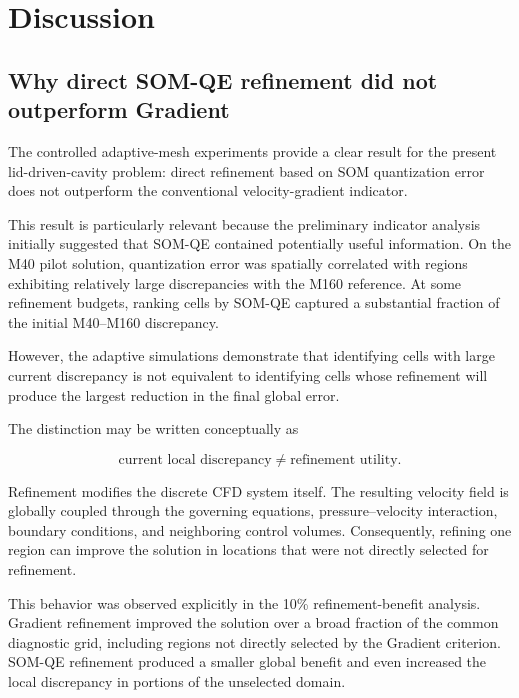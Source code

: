 \section{Discussion}
\label{sec:discussion}

\subsection{Why direct SOM-QE refinement did not outperform Gradient}

The controlled adaptive-mesh experiments provide a clear result for the
present lid-driven-cavity problem: direct refinement based on SOM
quantization error does not outperform the conventional velocity-gradient
indicator.

This result is particularly relevant because the preliminary indicator
analysis initially suggested that SOM-QE contained potentially useful
information. On the M40 pilot solution, quantization error was spatially
correlated with regions exhibiting relatively large discrepancies with the
M160 reference. At some refinement budgets, ranking cells by SOM-QE captured
a substantial fraction of the initial M40--M160 discrepancy.

However, the adaptive simulations demonstrate that identifying cells with
large current discrepancy is not equivalent to identifying cells whose
refinement will produce the largest reduction in the final global error.

The distinction may be written conceptually as

\begin{equation}
\text{current local discrepancy}
\neq
\text{refinement utility}.
\end{equation}

Refinement modifies the discrete CFD system itself. The resulting velocity
field is globally coupled through the governing equations, pressure--velocity
interaction, boundary conditions, and neighboring control volumes.
Consequently, refining one region can improve the solution in locations that
were not directly selected for refinement.

This behavior was observed explicitly in the 10\% refinement-benefit
analysis. Gradient refinement improved the solution over a broad fraction of
the common diagnostic grid, including regions not directly selected by the
Gradient criterion. SOM-QE refinement produced a smaller global benefit and
even increased the local discrepancy in portions of the unselected domain.

